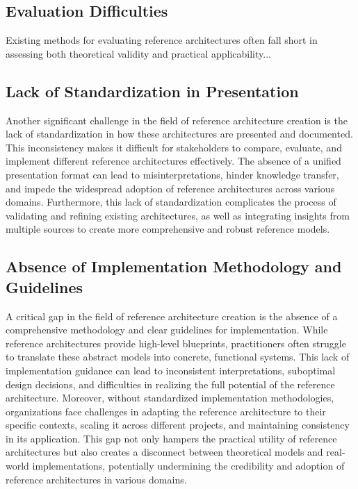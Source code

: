 \documentclass[12pt,a4paper]{article}
\begin{document}
\subsection{Evaluation Difficulties}
\label{subsec:evaluation}
Existing methods for evaluating reference architectures often fall short in assessing both theoretical validity and practical applicability...

\subsection{Lack of Standardization in Presentation}
\label{subsec:standardization}
Another significant challenge in the field of reference architecture creation is the lack of standardization in how these architectures are presented and documented. This inconsistency makes it difficult for stakeholders to compare, evaluate, and implement different reference architectures effectively. The absence of a unified presentation format can lead to misinterpretations, hinder knowledge transfer, and impede the widespread adoption of reference architectures across various domains. Furthermore, this lack of standardization complicates the process of validating and refining existing architectures, as well as integrating insights from multiple sources to create more comprehensive and robust reference models.

\subsection{Absence of Implementation Methodology and Guidelines}
\label{subsec:implementation-guidelines}
A critical gap in the field of reference architecture creation is the absence of a comprehensive methodology and clear guidelines for implementation. While reference architectures provide high-level blueprints, practitioners often struggle to translate these abstract models into concrete, functional systems. This lack of implementation guidance can lead to inconsistent interpretations, suboptimal design decisions, and difficulties in realizing the full potential of the reference architecture. Moreover, without standardized implementation methodologies, organizations face challenges in adapting the reference architecture to their specific contexts, scaling it across different projects, and maintaining consistency in its application. This gap not only hampers the practical utility of reference architectures but also creates a disconnect between theoretical models and real-world implementations, potentially undermining the credibility and adoption of reference architectures in various domains.
\end{document}
